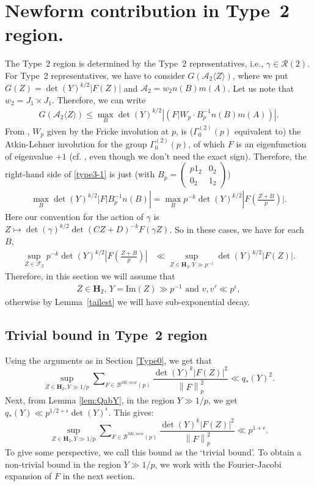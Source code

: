 \documentclass[11pt]{amsart}
\numberwithin{equation}{section}
\theoremstyle{plain}
\theoremstyle{definition}
\newcommand{\lemref}[1]{Lemma~\ref{#1}}
\newcommand{\htwo}{\mf H_2}
\newcommand{\mf}{\mathbf}
\newcommand{\mc}{\mathcal}
\newcommand{\mrm}{\mathrm}
\newcommand{\im}{\mrm{Im}}
\newcommand*{\norm}[1]{\left\lVert#1\right\rVert}
\newcommand{\sumn}{\sum \nolimits}
\newcommand{\psmb}{\left( \begin{smallmatrix}}
\newcommand{\psme}{ \end{smallmatrix} \right) }
\newcommand{\gp}{\Gamma^{(2)}_0(p)}
\newcommand{\finv}{\det(Y)^{k/2} |F(Z)|}
\begin{document}
\section{Newform contribution in Type~2 region.}
The Type~2 region is determined by the Type~2 representatives, i.e., $\gamma\in \mc R(2)$.
For Type~2 representatives, we have to consider $G (\mc A_2 \langle Z \rangle )$, where we put $G(Z) = \finv$ and $\mc A_2 = w_2 n(B)m(A)$. Let us note that $w_2 = J_1 \times J_1$. Therefore, we can write
\begin{align} \label{type3-1}
  G (\mc A_2 \langle Z \rangle )  \le \max_{B} \det(Y)^{k/2} | \left(F|  W_p \cdot B_p^{-1} n(B) m(A)\right)|.
\end{align}
From \cite{schmidt-AL}, $W_p$ given by the Fricke involution at $p$, is ($\gp$ equivalent to) the Atkin-Lehner involution for the group $\gp$, of which $F$ is an eigenfunction of eigenvalue $+1$ (cf. \cite{schmidt-SKlift}, even though we don't need the exact sign). Therefore, the right-hand side of \eqref{type3-1}
is just (with $B_p = \psmb p1_2 & 0_2 \\ 0_2 & 1_2 \psme$)
\begin{align}
    \max_{B} \det(Y)^{k/2} |F | B_p^{-1} n(B) | =  \max_{B} p^{-k} \det(Y)^{k/2} |F \left(\frac{ Z  +B}{p} \right) | .
\end{align}
Here our convention for the action of $\gamma$ is $Z \mapsto \det(\gamma)^{k/2} \det(CZ+D)^{-k} F(\gamma Z)$. So in these cases, we have for each $B$,
\begin{align}
   \sup_{Z \in  \mc F_2} p^{-k} \det(Y)^{k/2} |F \left(\frac{ Z  +B}{p} \right) | & \ll  \sup_{Z \in \mf H_2, Y \gg p^{-1}} \det(Y)^{k/2} |F(Z)| .
\end{align}
Therefore, in this section we will assume that
\begin{align} \label{y-region}
    Z \in \htwo, \, Y=\im(Z) \gg p^{-1} \text{ and } v,v'\ll p^\epsilon,
\end{align}
otherwise by \lemref{tailest} we will have sub-exponential decay. 

\subsection{Trivial bound in Type~2 region} Using the arguments as in Section \ref{Type0}, we get that 
\begin{equation}
    \sup_{Z \in \mf H_2, Y \gg 1/p}\sumn_{F \in \mc B^{SK, new}(p)}  \frac{\det(Y)^k |F(Z)|^2}{\norm{F}^2_p} \ll q_*(Y)^2.
\end{equation}
Next, from Lemma \ref{lem:QabY}, in the region $Y\gg 1/p$, we get $q_*(Y)\ll p^{1/2+\epsilon}\det(Y)^{\epsilon}$. This gives: 
\begin{equation} \label{new-type2}
    \sup_{Z \in \mf H_2, Y \gg 1/p}\sumn_{F \in \mc B^{SK, new}(p)}  \frac{\det(Y)^k |F(Z)|^2}{\norm{F}^2_p} \ll p^{1+\epsilon}.
\end{equation}
To give some perspective, we call this bound as the `trivial bound'. To obtain a non-trivial bound in the region $Y\gg 1/p$, we work with the Fourier-Jacobi expansion of $F$ in the next section.
\end{document}

